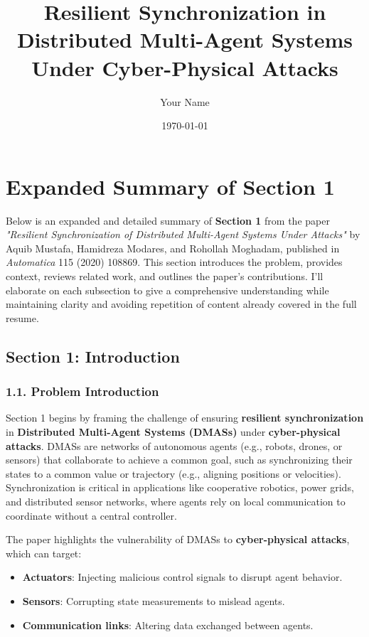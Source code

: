 \documentclass{article}
\title{Resilient Synchronization in Distributed Multi-Agent Systems Under Cyber-Physical Attacks}
\author{Your Name}
\date{\today}
\begin{document}
\maketitle

\section*{Expanded Summary of Section 1}

Below is an expanded and detailed summary of \textbf{Section 1} from the paper \textit{"Resilient Synchronization of Distributed Multi-Agent Systems Under Attacks"} by Aquib Mustafa, Hamidreza Modares, and Rohollah Moghadam, published in \textit{Automatica} 115 (2020) 108869. This section introduces the problem, provides context, reviews related work, and outlines the paper’s contributions. I’ll elaborate on each subsection to give a comprehensive understanding while maintaining clarity and avoiding repetition of content already covered in the full resume.

\subsection*{Section 1: Introduction}

\subsubsection*{1.1. Problem Introduction}
Section 1 begins by framing the challenge of ensuring \textbf{resilient synchronization} in \textbf{Distributed Multi-Agent Systems (DMASs)} under \textbf{cyber-physical attacks}. DMASs are networks of autonomous agents (e.g., robots, drones, or sensors) that collaborate to achieve a common goal, such as synchronizing their states to a common value or trajectory (e.g., aligning positions or velocities). Synchronization is critical in applications like cooperative robotics, power grids, and distributed sensor networks, where agents rely on local communication to coordinate without a central controller.

The paper highlights the vulnerability of DMASs to \textbf{cyber-physical attacks}, which can target:
\begin{itemize}
    \item \textbf{Actuators}: Injecting malicious control signals to disrupt agent behavior.
    \item \textbf{Sensors}: Corrupting state measurements to mislead agents.
    \item \textbf{Communication links}: Altering data exchanged between agents.
\end{itemize}
\end{document}

